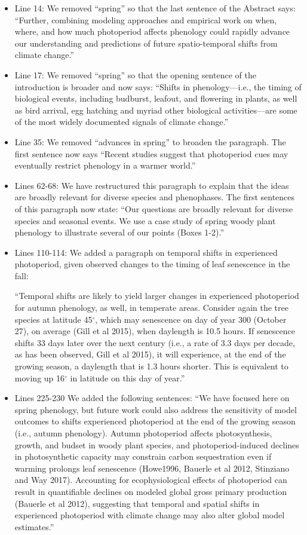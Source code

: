\documentclass{article}
\begin{document}
\begin{itemize}
\item Line 14: We removed ``spring'' so that the last sentence of the Abstract says: ``Further, combining modeling approaches and empirical work on when, where, and how much photoperiod affects phenology could rapidly advance our understanding and predictions of future spatio-temporal shifts from climate change.''
\item Line 17: We removed ``spring'' so that the opening sentence of the introduction is broader and now says: ``Shifts in phenology---i.e., the timing of biological events, including budburst, leafout, and flowering in plants, as well as bird arrival, egg hatching and myriad other biological activities---are some of the most widely documented signals of climate change.''
\item Line 35: We removed ``advances in spring'' to broaden the paragraph. The first sentence now says ``Recent studies suggest that photoperiod cues may eventually restrict phenology in a warmer world.''
\item Lines 62-68: We have restructured this paragraph to explain that the ideas are broadly relevant for diverse species and phenophases. The first sentences of this paragraph now state: ``Our questions are broadly relevant for diverse species and seasonal events. We use a case study of spring woody plant phenology to illustrate several of our points (Boxes 1-2).''  
\item Lines 110-114: We added a paragraph on temporal shifts in experienced photoperiod, given observed changes to the timing of leaf senescence in the fall: 
\par ``Temporal shifts are likely to yield larger changes in experienced photoperiod for autumn phenology, as well, in temperate areas. Consider again the tree species at latitude 45$^{\circ}$, which may senescence on day of year 300 (October 27), on average (Gill et al 2015), when daylength is 10.5 hours. If senescence shifts 33 days later over the next century (i.e., a rate of 3.3 days per decade, as has been observed, Gill et al 2015), it will experience, at the end of the growing season, a daylength that is 1.3 hours shorter. This is equivalent to moving up 16$^{\circ}$ in latitude on this day of year.''
\item Lines 225-230 We added the following sentences: ``We have focused here on spring phenology, but future work could also address the sensitivity of model outcomes to shifts experienced photoperiod at the end of the growing season (i.e., autumn phenology). Autumn photoperiod affects photosynthesis, growth, and budset in woody plant species, and photoperiod-induced declines in photosynthetic capacity may constrain carbon sequestration even if warming prolongs leaf senescence (Howe1996, Bauerle et al 2012, Stinziano and Way 2017). Accounting for ecophysiological effects of photoperiod can result in quantifiable declines on modeled global gross primary production (Bauerle et al 2012), suggesting that temporal and spatial shifts in experienced photoperiod with climate change may also alter global model estimates.''


\end{itemize}
\end{document}
